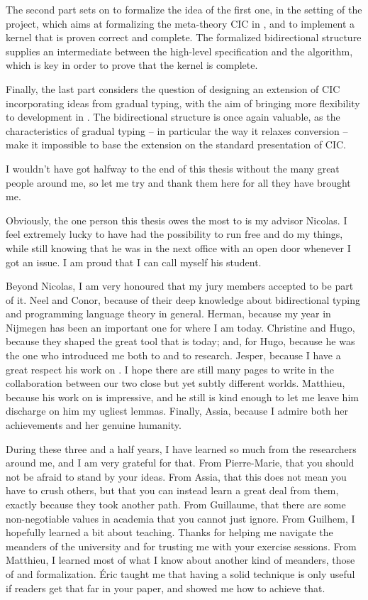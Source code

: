The second part sets on to formalize the idea of the first one,
in the setting of the  project,
which aims at formalizing the meta-theory CIC in , and to implement
a kernel that is proven correct and complete. The formalized bidirectional structure supplies
an intermediate between the high-level specification and the algorithm, which is key in
order to prove that the kernel is complete.

Finally, the last part considers the question of designing an extension of CIC incorporating
ideas from gradual typing, with the aim of bringing more flexibility to development in .
The bidirectional structure is once again valuable, as the characteristics of gradual typing
– in particular the way it relaxes conversion – 
make it impossible to base the extension on the standard presentation of CIC.


I wouldn’t have got halfway to the end of this thesis without the many great people around me,
so let me try and thank them here for all they have brought me.

Obviously, the one person this thesis owes the most to is my advisor Nicolas. I feel extremely
lucky to have had the possibility to run free and do my things, while still knowing that
he was in the next office with an open door whenever I got an issue.
I am proud that I can call myself his student.

Beyond Nicolas, I am very honoured that my jury members accepted to be part of it.
Neel and Conor,
because of their deep knowledge about bidirectional typing and programming language
theory in general.
Herman, because my year in Nijmegen has been an important one for where I am today.
Christine and Hugo, because they shaped the great tool that  is today; and, for Hugo,
because he was the one who introduced me both to  and to research.
Jesper, because I have a great respect his work on .
I hope there are still many pages to
write in the collaboration between our two close but yet subtly different worlds.
Matthieu, because his work on  is impressive, and he still is kind enough to
let me leave him discharge on him my ugliest lemmas.
Finally, Assia, because I admire both her achievements and her genuine humanity.

During these three and a half years, I have learned so much from the researchers around me,
and I am very grateful for that.
From Pierre-Marie, that you should not be afraid to stand by your ideas.
From Assia, that this does not mean you have to crush others,
but that you can instead learn a great deal from them, exactly because they took another path.
From Guillaume, that there are some non-negotiable values in academia that you cannot just 
ignore.
From Guilhem, I hopefully learned a bit about teaching. Thanks for helping me navigate the
meanders of the university and for trusting me with your exercise sessions.
From Matthieu, I learned most of what I know about another kind of meanders,
those of  and formalization.
Éric taught me that having a solid technique
is only useful if readers get that far in your paper, and showed me how to achieve that.

